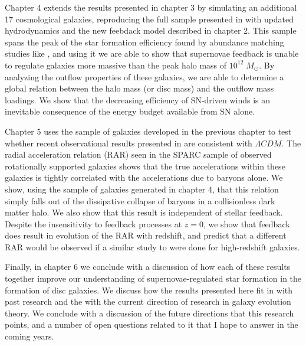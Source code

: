 Chapter 4 extends the results presented in chapter 3 by simulating an additional
17 cosmological galaxies, reproducing the full sample presented in
\citet{Stinson2010} with updated hydrodynamics and the new feebdack model
described in chapter 2.  This sample spans the peak of the star formation
efficiency found by abundance matching studies like \citet{Moster2013}, and
using it we are able to show that supernovae feedback is unable to regulate
galaxies more massive than the peak halo mass of $10^{12}\;M_\odot$.  By
analyzing the outflow properties of these galaxies, we are able to determine a
global relation between the halo mass (or disc mass) and the outflow mass
loadings.  We show that the decreasing efficiency of SN-driven winds is an
inevitable consequence of the energy budget available from SN alone.

Chapter 5 uses the sample of galaxies developed in the previous chapter to
test whether recent observational results presented in \citet{McGaugh2016}
are consistent with $\Lambda CDM$.  The radial acceleration relation (RAR) seen in
the SPARC sample \citep{Lelli2016} of observed rotationally supported galaxies
shows that the true accelerations within these galaxies is tightly correlated 
with the accelerations due to baryons alone.  We show, using the sample of
galaxies generated in chapter 4, that this relation simply falls out of the
dissipative collapse of baryons in a collisionless dark matter halo.  We also
show that this result is independent of stellar feedback.  Despite the insensitivity
to feedback processes at $z=0$, we show that feedback does result in evolution
of the RAR with redshift, and predict that a different RAR would be observed if
a similar study to \citep{Lelli2016} were done for high-redshift galaxies.

Finally, in chapter 6 we conclude with a discussion of how each of these results
together improve our understanding of supernovae-regulated star formation
in the formation of disc galaxies.  We discuss how the results presented here
fit in with past research and the with the current direction of research in
galaxy evolution theory.  We conclude with a discussion of the future directions
that this research points, and a number of open questions related to it that I
hope to answer in the coming years.



